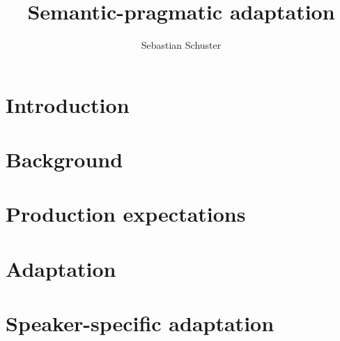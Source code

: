 \documentclass[hidelinks,12pt]{report}
\title{Semantic-pragmatic adaptation}
\author{Sebastian Schuster}
\begin{document}

    \beforepreface



    

    


    \afterpreface
 
    \chapter{Introduction}
    

    \chapter{Background}
    

    \chapter{Production expectations}
    

    \chapter{Adaptation}
    

    \chapter{Speaker-specific adaptation}
    
\end{document}

